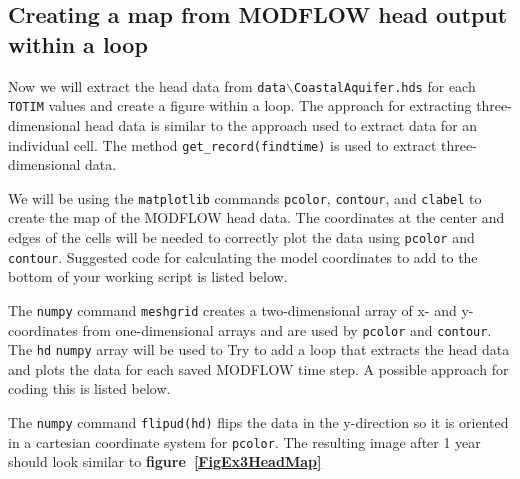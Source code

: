 \documentclass[12pt]{article}
\begin{document}
\subsection{Creating a map from MODFLOW head output within a loop}
Now we will extract the head data from \texttt{data$\backslash$Coastal\-Aquifer.hds} for each \texttt{TOTIM} values and create a figure within a loop. The approach for extracting three-dimensional head data is similar to the approach used to extract data for an individual cell. The method \texttt{get\_record(findtime)} is used to extract three-dimensional data.

We will be using the \texttt{matplotlib} commands \texttt{pcolor}, \texttt{contour}, and \texttt{clabel} to create the map of the MODFLOW head data. The coordinates at the center and edges of the cells will be needed to correctly plot the data using \texttt{pcolor} and \texttt{contour}. Suggested code for calculating the model coordinates to add to the bottom of your working script is listed below.

\begin{center}
	
\end{center}

The \texttt{numpy} command \texttt{meshgrid} creates a two-dimensional array of x- and y-coordinates from one-dimensional arrays and are used by \texttt{pcolor} and \texttt{contour}. The \texttt{hd} \texttt{numpy} array will be used to Try to add a loop that extracts the head data and plots the data for each saved MODFLOW time step. A possible approach for coding this is listed below.

\begin{center}
	
\end{center}

The \texttt{numpy} command \texttt{flipud(hd)} flips the data in the y-direction so it is oriented in a cartesian coordinate system for \texttt{pcolor}. The resulting image after 1 year should look similar to \textbf{figure~\ref{FigEx3HeadMap}}
\end{document}
